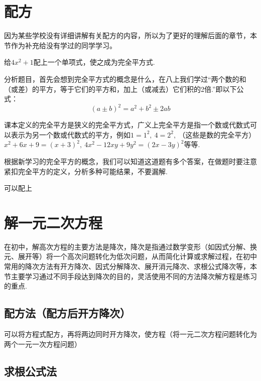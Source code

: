 \documentclass[lang=cn, 10pt, titlestyle=hang, oneside]{elegantbook}
\begin{document}
\section{配方}



因为某些学校没有详细讲解有关配方的内容，所以为了更好的理解后面的章节，本节作为补充给没有学过的同学学习。



\begin{example}
    给\( 4x^2 +1\)配上一个单项式，使之成为完全平方式.
\end{example}



分析题目，首先会想到完全平方式的概念是什么，在八上我们学过“两个数的和（或差）的平方，等于它们的平方和，加上（或减去）它们积的2倍.”即以下公式：
$$
(a\pm b)^2 = a^2+b^2\pm 2ab
$$



课本定义的完全平方是狭义的完全平方式，广义上完全平方是指一个数或代数式可以表示为另一个数或代数式的平方，例如\( 1=1^2,\ 4=2^2,\ \)（这些是数的完全平方）\(x^2+6x+9=(x+3)^2,\ 4x^2-12xy+9y^2=(2x-3y)^2\)等等.



根据新学习的完全平方的概念，我们可以知道这道题有多个答案，在做题时要注意紧扣完全平方的定义，分析多种可能结果，不要漏解.
\begin{solution}
    可以配上
\end{solution}

\section{解一元二次方程}
在初中，解高次方程的主要方法是降次，降次是指通过数学变形（如因式分解、换元、展开等）将一个高次问题转化为低次问题，从而简化计算或求解过程，在初中常用的降次方法有开方降次、因式分解降次、展开消元降次、求根公式降次等，本节主要学习通过不同手段达到降次的目的，灵活使用不同的方法降次解方程是练习的重点.
\subsection{配方法（配方后开方降次）}





可以将方程式配方，再将两边同时开方降次，使方程（将一元二次方程问题转化为两个一元一次方程问题）

\subsection{求根公式法}
\end{document}
